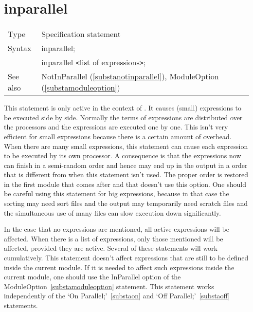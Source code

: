 
\section{inparallel}
\label{substainparallel}

\noindent \begin{tabular}{ll}
Type & Specification statement\\
Syntax & inparallel; \\
       & inparallel {\tt<}list of expressions{\tt>};
\\ See also & NotInParallel (\ref{substanotinparallel}), 
     ModuleOption (\ref{substamoduleoption})
\end{tabular} \vspace{4mm}

\noindent This statement is only active in the context of 
\TFORM{}. It causes 
(small) expressions to be executed side by side. Normally the terms of 
expressions are distributed over the processors and the expressions are 
executed one by one. This isn't very efficient for small expressions 
because there is a certain amount of overhead. When there are many small 
expressions, this statement can cause each expression to be executed by its 
own processor. A consequence is that the expressions now can finish in a 
semi-random order and hence may end up in the output in a order that is 
different from when this statement isn't used. The proper order is restored 
in the first module that comes after and that doesn't use this option. One 
should be careful using this statement for big expressions, because in that 
case the sorting may need sort files and the output may temporarily need 
scratch files and the simultaneous use of many files can slow execution 
down significantly.

\noindent In the case that no expressions are mentioned, all active 
expressions will be affected. When there is a list of expressions, only 
those mentioned will be affected, provided they are active. Several of 
these statements will work cumulatively. This statement doesn't affect 
expressions that are still to be defined inside the current module. If it 
is needed to affect such expressions inside the current module, one should 
use the InParallel option of the 
ModuleOption~\ref{substamoduleoption} 
statement. This statement works independently of the `On 
Parallel;'~\ref{substaon} and `Off Parallel;'~\ref{substaoff} statements.
\vspace{10mm}

